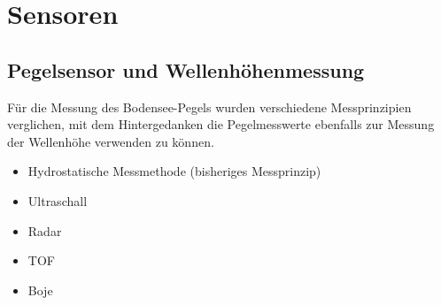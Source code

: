 \section{Sensoren}


\subsection{Pegelsensor und Wellenhöhenmessung}

Für die Messung des Bodensee-Pegels wurden verschiedene Messprinzipien verglichen, mit dem Hintergedanken die Pegelmesswerte ebenfalls zur Messung der Wellenhöhe verwenden zu können.

\begin{itemize}
\item Hydrostatische Messmethode (bisheriges Messprinzip)
\item Ultraschall
\item Radar
\item TOF
\item Boje
\end{itemize}


